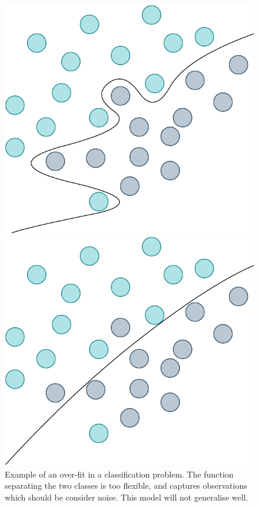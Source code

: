 \begin{figure}
  \begin{minipage}{.46\textwidth}
    \includegraphics[scale=0.5,width=\textwidth]{figures/over-fit-example}
    \caption{Example of an over-fit in a classification problem. The
      function separating the two classes is too flexible, and captures observations
      which should be consider noise. This model will not generalise well. }\label{fig:over-fit-example}
  \end{minipage}
  \hspace{5pt}
  \begin{minipage}{.46\textwidth}
    \includegraphics[scale=0.48,width=\textwidth]{figures/good-fit-example}

\end{minipage}
\end{figure}
